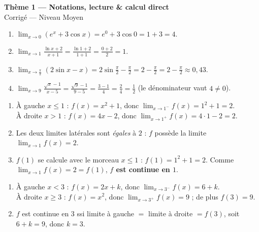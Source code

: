 \documentclass[11pt,a4paper]{article}
\begin{document}
\begin{center}
{\Large\bfseries\color{primarydark}Thème 1 — Notations, lecture \& calcul direct}\\[2pt]
{\large\color{excol}Corrigé — Niveau Moyen}
\end{center}
\vspace{6pt}

\begin{correction}
\begin{enumerate}[label=\alph*),leftmargin=2em,itemsep=3pt]
  \item $\displaystyle\lim_{x\to 0}(e^{x}+3\cos x)=e^{0}+3\cos 0=1+3=\boxed{4}$.
  \item $\displaystyle\lim_{x\to 1}\frac{\ln x+2}{x+1}=\frac{\ln 1+2}{1+1}=\frac{0+2}{2}=\boxed{1}$.
  \item $\displaystyle\lim_{x\to \frac{\pi}{2}}(2\sin x-x)=2\sin\tfrac{\pi}{2}-\tfrac{\pi}{2}=2-\tfrac{\pi}{2}=\boxed{2-\tfrac{\pi}{2}}\approx 0{,}43$.
  \item $\displaystyle\lim_{x\to 9}\frac{\sqrt{x}-1}{x-5}=\frac{\sqrt{9}-1}{9-5}=\frac{3-1}{4}=\frac{2}{4}=\boxed{\tfrac12}$
        (le dénominateur vaut $4\neq 0$).
\end{enumerate}
\end{correction}

\begin{correction}
\begin{enumerate}[label=\alph*),leftmargin=2em,itemsep=3pt]
  \item À gauche $x\leq 1$ : $f(x)=x^2+1$, donc $\displaystyle\lim_{x\to 1^{-}} f(x)=1^2+1=2$.\\
        À droite $x>1$ : $f(x)=4x-2$, donc $\displaystyle\lim_{x\to 1^{+}} f(x)=4\cdot 1-2=2$.
  \item Les deux limites latérales sont \emph{égales} à $2$ : $f$ possède la limite $\displaystyle\lim_{x\to 1} f(x)=2$.
  \item $f(1)$ se calcule avec le morceau $x\leq 1$ : $f(1)=1^2+1=2$. Comme
        $\displaystyle\lim_{x\to 1} f(x)=2=f(1)$, \textbf{$f$ est continue en $1$}.
\end{enumerate}
\end{correction}

\begin{correction}
\begin{enumerate}[label=\alph*),leftmargin=2em,itemsep=3pt]
  \item À gauche $x<3$ : $f(x)=2x+k$, donc $\displaystyle\lim_{x\to 3^{-}} f(x)=6+k$.\\
        À droite $x\geq 3$ : $f(x)=x^2$, donc $\displaystyle\lim_{x\to 3^{+}} f(x)=9$ ; de plus $f(3)=9$.
  \item $f$ est continue en $3$ ssi limite à gauche $=$ limite à droite $=f(3)$, soit
        $6+k=9$, donc $\boxed{k=3}$.
\end{enumerate}
\end{correction}
\end{document}
